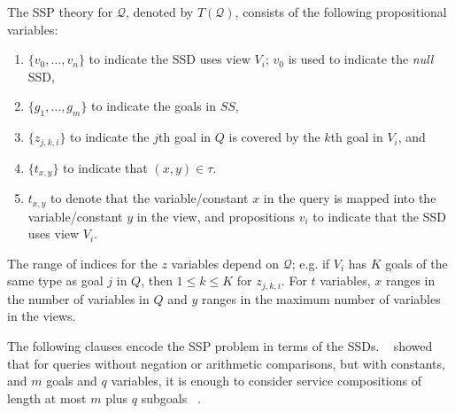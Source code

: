 \documentclass{llncs}
\newcommand{\denselist}{\topsep 0pt \itemsep -4pt}
\newcommand{\Q}{\mathcal{Q}}
\newcommand{\Theory}[1]{T(#1)}
\begin{document}
The SSP theory for $\Q$,  denoted by $\Theory{\Q}$, consists
of the following propositional variables:
\begin{enumerate}\denselist
\item $\{v_0,\ldots,v_n\}$ to indicate the SSD uses view $V_i$;
      $v_0$ is used to indicate the \emph{null} SSD,
\item $\{g_1,\ldots,g_m\}$ to indicate the goals in $SS$,
\item $\{z_{j,k,i}\}$ to indicate the $j$th goal in $Q$ is
      covered by the $k$th goal in $V_i$, and
\item $\{t_{x,y}\}$ to indicate that $(x,y)\in\tau$.
\item $t_{x,y}$
to denote that the variable/constant $x$ in the query is mapped
into the variable/constant $y$ in the view, and propositions $v_i$
to indicate that the SSD uses view $V_i$.
\end{enumerate}
The range of indices for the $z$ variables depend on $\Q$;
e.g. if $V_i$ has $K$ goals of the same type as goal
$j$ in $Q$, then $1\leq k\leq K$ for $z_{j,k,i}$.
For $t$ variables, $x$ ranges in the number of variables
in $Q$ and $y$ ranges in the maximum number of variables
in the views.

The following  clauses encode the SSP problem in terms of the SSDs. ~\cite{RajaramanSU95} showed that for queries without negation or arithmetic comparisons,  but with constants, and $m$ goals and $q$ variables, it is enough
to consider service compositions of length at most  $m$ plus  $q$ subgoals ~\cite{Ullman00}.
\end{document}
